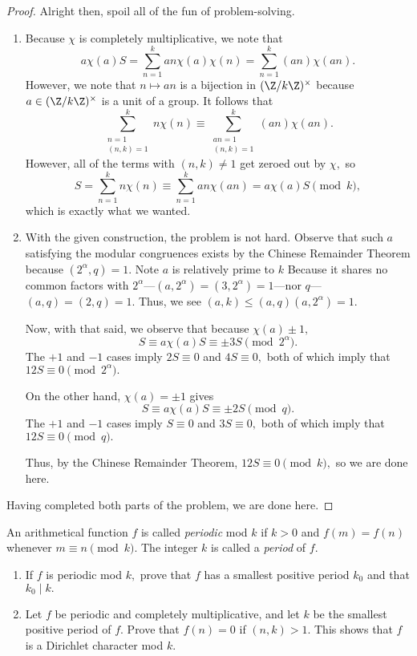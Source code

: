 \begin{proof}
Alright then, spoil all of the fun of problem-solving.
\begin{enumerate}[label=(\alph*)]
    \item Because $\chi$ is completely multiplicative, we note that
    \[a\chi(a)S=\sum_{n=1}^kan\chi(a)\chi(n)=\sum_{n=1}^k(an)\chi(an).\]
    However, we note that $n\mapsto an$ is a bijection in $(\Z/k\Z)^\times$ because $a\in(\Z/k\Z)^\times$ is a unit of a group. It follows that
    \[\sum_{\substack{n=1\\(n,k)=1}}^kn\chi(n)\equiv\sum_{\substack{an=1\\(n,k)=1}}^k(an)\chi(an).\]
    However, all of the terms with $(n,k)\ne1$ get zeroed out by $\chi,$ so
    \[S=\sum_{n=1}^kn\chi(n)\equiv\sum_{n=1}^kan\chi(an)=a\chi(a)S\pmod k,\]
    which is exactly what we wanted.
    \item With the given construction, the problem is not hard. Observe that such $a$ satisfying the modular congruences exists by the Chinese Remainder Theorem because $\left(2^\alpha,q\right)=1.$ Note $a$ is relatively prime to $k$ Because it shares no common factors with $2^\alpha$---$\left(a,2^\alpha\right)=\left(3,2^\alpha\right)=1$---nor $q$---$(a,q)=(2,q)=1.$ Thus, we see $(a,k)\le(a,q)\left(a,2^\alpha\right)=1.$
    
    Now, with that said, we observe that because $\chi(a)\pm1,$
    \[S\equiv a\chi(a)S\equiv\pm3S\pmod{2^{\alpha}}.\]
    The $+1$ and $-1$ cases imply $2S\equiv0$ and $4S\equiv0,$ both of which imply that $12S\equiv0\pmod{2^\alpha}.$
    
    On the other hand, $\chi(a)=\pm1$ gives
    \[S\equiv a\chi(a)S\equiv\pm2S\pmod q.\]
    The $+1$ and $-1$ cases imply $S\equiv0$ and $3S\equiv0,$ both of which imply that $12S\equiv0\pmod q.$
    
    Thus, by the Chinese Remainder Theorem, $12S\equiv0\pmod k,$ so we are done here.
\end{enumerate}
Having completed both parts of the problem, we are done here.
\end{proof}

\begin{exercise}
An arithmetical function $f$ is called \textit{periodic} mod $k$ if $k>0$ and $f(m)=f(n)$ whenever $m\equiv n\pmod k.$ The integer $k$ is called a \textit{period} of $f.$
\begin{enumerate}[label=(\alph*)]
    \item If $f$ is periodic mod $k,$ prove that $f$ has a smallest positive period $k_0$ and that $k_0\mid k.$
    \item Let $f$ be periodic and completely multiplicative, and let $k$ be the smallest positive period of $f.$ Prove that $f(n)=0$ if $(n,k)>1.$ This shows that $f$ is a Dirichlet character mod $k.$
\end{enumerate}
\end{exercise}


